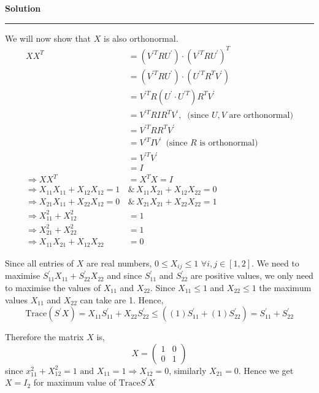 \documentclass[a4paper,14pt]{article}
\newenvironment{solution}[2][]{%
    \begin{mdframed}[linecolor=blue!70!black, linewidth=2pt, roundcorner=10pt, backgroundcolor=yellow!10!white, skipabove=12pt, skipbelow=12pt]%
        \textbf{\large #2}
        \par\noindent\rule{\textwidth}{0.4pt}
}{
    \end{mdframed}
}
\begin{document}
\begin{solution}{Solution}
    We will now show that $X$ is also orthonormal.
    \begin{align*}
      X X^{T} &= (V^{'T} R U^{'}) \cdot {(V^{'T} R U^{'})}^{T} \\
              &= (V^{'T} R U^{'}) \cdot (U^{'T} R^{T} V^{'}) \\
              &= V^{'T} R (U^{'} \cdot U^{'T}) R^{T} V^{'} \\
              &= V^{'T} R I R^{T} V^{'} ,\ \text{ (since $U,V$ are orthonormal)}\\
              &= V^{'T} RR^{T} V^{'} \\
              &= V^{'T} I V^{'} \, \text{ (since $R$ is orthonormal)}\\
              &= V^{'T} V^{'} \\
              &= I \\
      \Rightarrow X X^{T} &= X^{T} X = I \\
      \Rightarrow X_{11}X_{11} + X_{12}X_{12} = 1 \, &\text{\&} \, X_{11}X_{21} + X_{12}X_{22} = 0 \\
      \Rightarrow X_{21}X_{11} + X_{22}X_{12} = 0 \, &\text{\&} \, X_{21}X_{21} + X_{22}X_{22} = 1 \\
      \Rightarrow X_{11}^{2} + X_{12}^{2} &= 1  \\
      \Rightarrow X_{21}^{2} + X_{22}^{2} &= 1 \\
      \Rightarrow X_{11}X_{21} + X_{12}X_{22} &= 0
    \end{align*}

    Since all entries of $X$ are real numbers, $0 \leqslant X_{ij} \leqslant 1$ $\forall i,j \in [1,2]$. We need to maximise
    $S^{'}_{11}X_{11} + S^{'}_{22}X_{22}$ and since $S^{'}_{11}$ and $S^{'}_{22}$ are positive values, we only need to maximise
    the values of $X_{11}$ and $X_{22}$. Since $X_{11} \leqslant 1$ and $X_{22} \leqslant 1$ the maximum values $X_{11}$ and 
    $X_{22}$ can take are 1. Hence,
    \[\text{Trace}(S^{'}X) = X_{11}S^{'}_{11} + X_{22}S^{'}_{22} \leqslant ((1)S^{'}_{11} + (1)S^{'}_{22}) =  S^{'}_{11} + S^{'}_{22}\]
 
    Therefore the matrix $X$ is,
    \[ X = \begin{pmatrix}
      1 & 0 \\
      0 & 1
    \end{pmatrix}\]
    since $x_{11}^{2} + X_{12}^{2} = 1 \text{ and } X_{11} = 1 \Rightarrow X_{12} = 0$, similarly $X_{21} = 0$. Hence we get 
    $X = I_{2}$ for maximum value of $\text{Trace}S^{'}X$


\end{solution}
\end{document}
